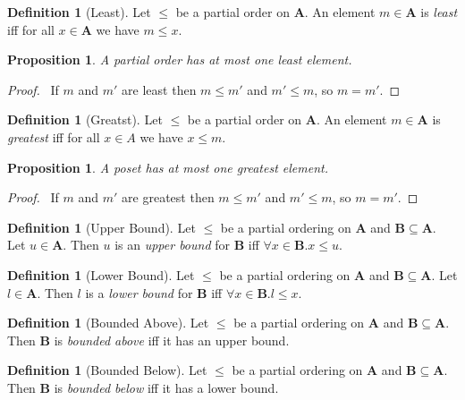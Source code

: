 \documentclass{book}
\let\qed\relax
\newtheorem{prop}[ax]{Proposition}
\theoremstyle{definition}
\newtheorem{df}[ax]{Definition}
\begin{document}
\begin{df}[Least]
Let $\leq$ be a partial order on $\mathbf{A}$. An element $m \in \mathbf{A}$ is \emph{least} iff for all $x \in \mathbf{A}$ we have $m \leq x$.
\end{df}

\begin{prop}
A partial order has at most one least element.
\end{prop}

\begin{proof}
\pf\ If $m$ and $m'$ are least then $m \leq m'$ and $m' \leq m$, so $m = m'$. \qed
\end{proof}

\begin{df}[Greatst]
Let $\leq$ be a partial order on $\mathbf{A}$. An element $m \in \mathbf{A}$ is \emph{greatest} iff for all $x \in A$ we have $x \leq m$.
\end{df}

\begin{prop}
A poset has at most one greatest element.
\end{prop}

\begin{proof}
\pf\ If $m$ and $m'$ are greatest then $m \leq m'$ and $m' \leq m$, so $m = m'$. \qed
\end{proof}

\begin{df}[Upper Bound]
Let $\leq$ be a partial ordering on $\mathbf{A}$ and $\mathbf{B} \subseteq \mathbf{A}$. Let $u \in \mathbf{A}$. Then $u$ is an \emph{upper bound} for $\mathbf{B}$ iff $\forall x \in \mathbf{B}. x \leq u$.
\end{df}

\begin{df}[Lower Bound]
Let $\leq$ be a partial ordering on $\mathbf{A}$ and $\mathbf{B} \subseteq \mathbf{A}$. Let $l \in \mathbf{A}$. Then $l$ is a \emph{lower bound} for $\mathbf{B}$ iff $\forall x \in \mathbf{B}. l \leq x$.
\end{df}

\begin{df}[Bounded Above]
Let $\leq$ be a partial ordering on $\mathbf{A}$ and $\mathbf{B} \subseteq \mathbf{A}$. Then $\mathbf{B}$ is \emph{bounded above} iff it has an upper bound.
\end{df}

\begin{df}[Bounded Below]
Let $\leq$ be a partial ordering on $\mathbf{A}$ and $\mathbf{B} \subseteq \mathbf{A}$. Then $\mathbf{B}$ is \emph{bounded below} iff it has a lower bound.
\end{df}
\end{document}
